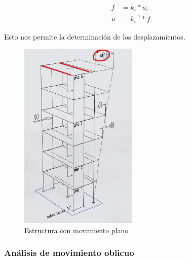 \documentclass[../main.tex]{subfiles}
\begin{document}
\begin{align*}
  f &= k_i * u_i \\[5pt]
  u &= k_i^{-1} * f
.\end{align*}

Esto nos permite la determinación de los desplazamientos.


\begin{figure}[htpb]
  \centering
  \includegraphics[width=0.5\textwidth]{../images/20210601/movplano}
  \caption{Estructura con movimiento plano}
  \label{fig:movplano}
\end{figure}

\subsubsection{Análisis de movimiento oblicuo}
\end{document}
